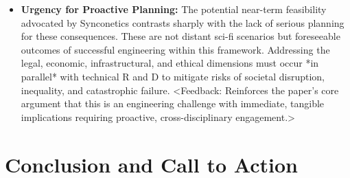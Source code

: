 \documentclass[10pt]{article}
\begin{document}
\begin{sloppypar}
\begin{itemize}
    \item \textbf{Urgency for Proactive Planning:} The potential near-term feasibility advocated by Synconetics contrasts sharply with the lack of serious planning for these consequences. These are not distant sci-fi scenarios but foreseeable outcomes of successful engineering within this framework. Addressing the legal, economic, infrastructural, and ethical dimensions must occur *in parallel* with technical R and D to mitigate risks of societal disruption, inequality, and catastrophic failure. <Feedback: Reinforces the paper's core argument that this is an engineering challenge with immediate, tangible implications requiring proactive, cross-disciplinary engagement.>

  \end{itemize}

  \section{Conclusion and Call to Action}
  \label{sec:conclusion}


  \pagebreak
  
  
  \nocite{*}

\end{sloppypar}
\end{document}
